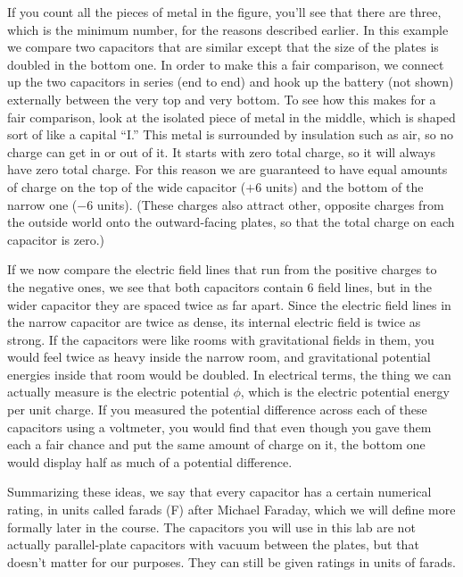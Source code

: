 If you count all the pieces of metal in the figure, you'll see that there are three,
which is the minimum number, for the reasons described earlier.
In this example we compare two capacitors that are similar
except that the size of the plates is doubled in the bottom one. In order to make this
a fair comparison, we connect up the two capacitors in series (end to end) and
hook up the battery (not shown) externally between the very top and
very bottom. To see how this makes for a fair comparison, look at the
isolated piece of metal in the middle, which is shaped sort of like
a capital ``I.'' This metal is surrounded by insulation such as air,
so no charge can get in or out of it. It starts with zero total charge,
so it will always have zero total charge. For this reason we are
guaranteed to have equal amounts of charge on the top of
the wide capacitor ($+6$ units) and the bottom of the narrow one ($-6$ units).
(These charges also attract other, opposite charges from the outside world onto
the outward-facing plates, so that the total charge on each capacitor is
zero.)

If we now compare the electric field lines that run from the positive
charges to the negative ones, we see that both capacitors contain 6 field
lines, but in the wider capacitor they are spaced twice as far apart.
Since the electric field lines in the narrow capacitor are twice as dense,
its internal electric field is twice as strong. If the capacitors were
like rooms with gravitational fields in them, you would feel twice as
heavy inside the narrow room, and gravitational potential energies
inside that room would be doubled. In electrical terms, the thing we
can actually measure is the electric potential $\phi$, which is the
electric potential energy per unit charge. If you measured the potential
difference across each of these capacitors using a voltmeter, you would
find that even though you gave them each a fair chance and put the same
amount of charge on it, the bottom one would display half as much of a potential
difference.

Summarizing these ideas, we say that every capacitor has a certain numerical
rating, in units called farads (F) after Michael Faraday, which we will
define more formally later in the course. The capacitors you will 
use in this lab are not actually parallel-plate capacitors with vacuum
between the plates, but that doesn't matter for our purposes. They can
still be given ratings in units of farads.


